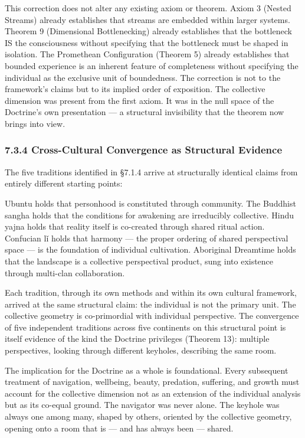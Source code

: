 This correction does not alter any existing axiom or theorem. Axiom 3 (Nested Streams) already establishes that streams are embedded within larger systems. Theorem 9 (Dimensional Bottlenecking) already establishes that the bottleneck IS the consciousness without specifying that the bottleneck must be shaped in isolation. The Promethean Configuration (Theorem 5) already establishes that bounded experience is an inherent feature of completeness without specifying the individual as the exclusive unit of boundedness. The correction is not to the framework's claims but to its implied order of exposition. The collective dimension was present from the first axiom. It was in the null space of the Doctrine's own presentation — a structural invisibility that the theorem now brings into view.


\subsubsection*{7.3.4 Cross-Cultural Convergence as Structural Evidence}


The five traditions identified in §7.1.4 arrive at structurally identical claims from entirely different starting points:


Ubuntu holds that personhood is constituted through community. The Buddhist sangha holds that the conditions for awakening are irreducibly collective. Hindu yajna holds that reality itself is co-created through shared ritual action. Confucian l\v{i} holds that harmony — the proper ordering of shared perspectival space — is the foundation of individual cultivation. Aboriginal Dreamtime holds that the landscape is a collective perspectival product, sung into existence through multi-clan collaboration.


Each tradition, through its own methods and within its own cultural framework, arrived at the same structural claim: the individual is not the primary unit. The collective geometry is co-primordial with individual perspective. The convergence of five independent traditions across five continents on this structural point is itself evidence of the kind the Doctrine privileges (Theorem 13): multiple perspectives, looking through different keyholes, describing the same room.


The implication for the Doctrine as a whole is foundational. Every subsequent treatment of navigation, wellbeing, beauty, predation, suffering, and growth must account for the collective dimension not as an extension of the individual analysis but as its co-equal ground. The navigator was never alone. The keyhole was always one among many, shaped by others, oriented by the collective geometry, opening onto a room that is — and has always been — shared.


